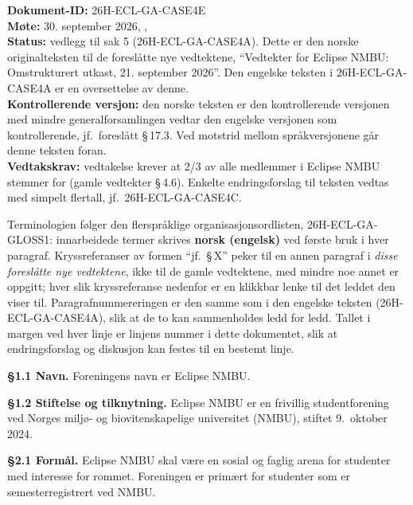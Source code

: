 \documentclass{../../../Common/Latex/Templates/rapport}
\date{\motedato, \meetingtime}
\newcommand{\motedato}{30. september 2026}
\newcommand{\motelinje}{\textbf{Møte:} \motedato, \meetingtime, \meetinglocation}
\begin{document}
\makecoverpage
\tableofcontents
\reportmainmatter

\noindent\textbf{Dokument-ID:} 26H-ECL-GA-CASE4E\\
\motelinje\\
\textbf{Status:} vedlegg til sak 5 (26H-ECL-GA-CASE4A). Dette er den norske originalteksten til de foresl\r{a}tte nye vedtektene, ``Vedtekter for Eclipse NMBU: Omstrukturert utkast, 21. september 2026''. Den engelske teksten i 26H-ECL-GA-CASE4A er en oversettelse av denne.\\
\textbf{Kontrollerende versjon:} den norske teksten er den kontrollerende versjonen med mindre generalforsamlingen vedtar den engelske versjonen som kontrollerende, jf.\ foresl\r{a}tt \S\,17.3. Ved motstrid mellom spr\r{a}kversjonene g\r{a}r denne teksten foran.\\
\textbf{Vedtakskrav:} vedtakelse krever at 2/3 av alle medlemmer i Eclipse NMBU stemmer for (gamle vedtekter \S\,4.6). Enkelte endringsforslag til teksten vedtas med simpelt flertall, jf.\ 26H-ECL-GA-CASE4C.

Terminologien følger den flerspr\r{a}klige organisasjonsordlisten, 26H-ECL-GA-GLOSS1: innarbeidede termer skrives \textbf{norsk (engelsk)} ved første bruk i hver paragraf. Kryssreferanser av formen ``jf.\ \S\,X'' peker til en annen paragraf i \emph{disse foresl\r{a}tte nye vedtektene}, ikke til de gamle vedtektene, med mindre noe annet er oppgitt; hver slik kryssreferanse nedenfor er en klikkbar lenke til det leddet den viser til. Paragrafnummereringen er den samme som i den engelske teksten (26H-ECL-GA-CASE4A), slik at de to kan sammenholdes ledd for ledd. Tallet i margen ved hver linje er linjens nummer i dette dokumentet, slik at endringsforslag og diskusjon kan festes til en bestemt linje.

\linenumbers


\label{nbylaw:1}
\textbf{\S 1.1 Navn.}\label{nbylaw:1.1} Foreningens navn er Eclipse NMBU.

\textbf{\S 1.2 Stiftelse og tilknytning.}\label{nbylaw:1.2} Eclipse NMBU er en frivillig studentforening ved Norges miljø- og biovitenskapelige universitet (NMBU), stiftet 9.\ oktober 2024.

\label{nbylaw:2}
\textbf{\S 2.1 Form\r{a}l.}\label{nbylaw:2.1} Eclipse NMBU skal være en sosial og faglig arena for studenter med interesse for rommet. Foreningen er primært for studenter som er semesterregistrert ved NMBU.
\end{document}
